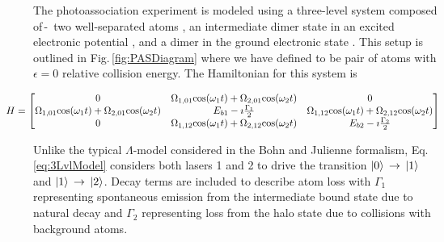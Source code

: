 The photoassociation experiment is modeled using a three-level system composed of\,-\, two well-separated atoms , an intermediate dimer state in an excited electronic potential , and a dimer in the ground electronic state .
This setup is outlined in Fig.\,\ref{fig:PASDiagram} where we have defined  to be pair of atoms with $\epsilon=0$ relative collision energy.
The Hamiltonian for this system is

\begin{equation} \label{eq:3LvlModel}
\hspace*{-1cm} 
	H=
    \begin{bmatrix}
      0 & \Omega_{1,01}\mathrm{cos}(\omega_1 t) + \Omega_{2,01}\mathrm{cos}(\omega_2 t) & 0 \\
      \Omega_{1,01}\mathrm{cos}(\omega_1 t)+ \Omega_{2,01}\mathrm{cos}(\omega_2 t) & E_{b1} - \imath \frac{\Gamma_1}{2} & \Omega_{1,12}\mathrm{cos}(\omega_1 t)+ \Omega_{2,12}\mathrm{cos}(\omega_2 t) \\
      0 & \Omega_{1,12}\mathrm{cos}(\omega_1 t)+ \Omega_{2,12}\mathrm{cos}(\omega_2 t) & E_{b2} - \imath \frac{\Gamma_2}{2} \\
    \end{bmatrix}
\end{equation}

\bigskip
Unlike the typical $\Lambda$-model considered in the Bohn and Julienne formalism, Eq.\,\ref{eq:3LvlModel} considers both lasers 1 and 2 to drive the transition $\left| {0} \right>\,\rightarrow\,\left| {1} \right>$ and $\left| {1} \right>\,\rightarrow\,\left| {2} \right>$.
Decay terms are included to describe atom loss with $\Gamma_1$ representing spontaneous emission from the intermediate bound state due to natural decay and $\Gamma_2$ representing loss from the halo state due to collisions with background atoms.

